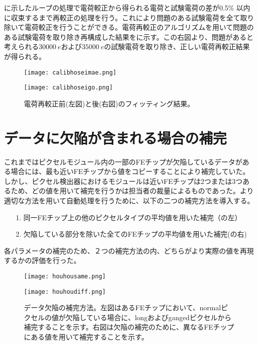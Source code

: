 に示したループの処理で電荷較正から得られる電荷と試験電荷の差が0.5\% 以内に収束するまで再較正の処理を行う。これにより問題のある試験電荷を全て取り除いて電荷較正を行うことができる。電荷再較正のアルゴリズムを用いて問題のある試験電荷を取り除き再構成した結果をに示す。この右図より、問題があると考えられる$30000\ \si{e}$および$35000\ \si{e}$の試験電荷を取り除き、正しい電荷再較正結果が得られる。

\begin{figure}[tbp]
  \begin{minipage}[b]{0.5\linewidth}
    \centering
    \texttt{[image: calibhoseimae.png]}
  \end{minipage}
  \begin{minipage}[b]{0.5\linewidth}
    \centering
    \texttt{[image: calibhoseigo.png]}
  \end{minipage}
  \caption[電荷再較正前後のフィッティング結果]{電荷再較正前(左図)と後(右図)のフィッティング結果。}
  \label{fig:calibhosei}
\end{figure}


\section{データに欠陥が含まれる場合の補完}
\label{sec:kessonhosei}
これまではピクセルモジュール内の一部のFEチップが欠陥しているデータがある場合には、最も近いFEチップから値をコピーすることにより補完していた。しかし、ピクセル検出器におけるモジュールは近いFEチップは2つまたは3つあるため、どの値を用いて補完を行うかは担当者の裁量によるものであった。より適切な方法を用いて自動処理を行うために、以下の二つの補完方法を導入する。
\begin{itemize}
  \item[1. ] 同一FEチップ上の他のピクセルタイプの平均値を用いた補完（の左）
  \item[2. ] 欠陥している部分を除いた全てのFEチップの平均値を用いた補完(の右)
\end{itemize}
各パラメータの補完のため、２つの補完方法の内、どちらがより実際の値を再現するかの評価を行った。

\begin{figure}[tbp]
  \begin{minipage}[b]{0.5\linewidth}
    \centering
    \texttt{[image: houhousame.png]}
  \end{minipage}
  \begin{minipage}[b]{0.5\linewidth}
    \centering
    \texttt{[image: houhoudiff.png]}
  \end{minipage}
  \caption[データ欠陥の補完方法]{データ欠陥の補完方法。左図はあるFEチップにおいて、normalピクセルの値が欠陥している場合に、longおよびgangedピクセルから補完することを示す。右図は欠陥の補完のために、異なるFEチップにある値を用いて補完することを示す。}
  \label{fig:houhouhou}
\end{figure}


